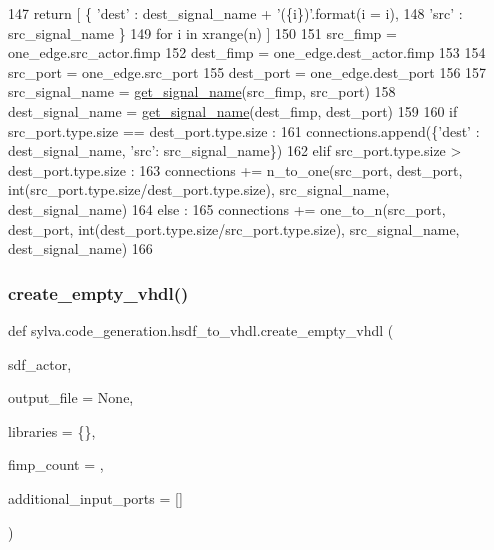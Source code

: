 \begin{DoxyCode}
147       \textcolor{keywordflow}{return} [ \{ \textcolor{stringliteral}{'dest'} : dest\_signal\_name + \textcolor{stringliteral}{'(\{i\})'}.format(i = i),
148                  \textcolor{stringliteral}{'src'}  : src\_signal\_name \}
149                \textcolor{keywordflow}{for} i \textcolor{keywordflow}{in} xrange(n) ]
150 
151   src\_fimp = one\_edge.src\_actor.fimp
152   dest\_fimp = one\_edge.dest\_actor.fimp
153 
154   src\_port = one\_edge.src\_port
155   dest\_port = one\_edge.dest\_port
156 
157   src\_signal\_name = \hyperlink{namespacesylva_1_1code__generation_1_1hsdf__to__vhdl_adfe6fda6b02f34c7fd4f2775ced8228f}{get\_signal\_name}(src\_fimp, src\_port)
158   dest\_signal\_name = \hyperlink{namespacesylva_1_1code__generation_1_1hsdf__to__vhdl_adfe6fda6b02f34c7fd4f2775ced8228f}{get\_signal\_name}(dest\_fimp, dest\_port)
159 
160   \textcolor{keywordflow}{if} src\_port.type.size == dest\_port.type.size :
161     connections.append(\{\textcolor{stringliteral}{'dest'} : dest\_signal\_name, \textcolor{stringliteral}{'src'}: src\_signal\_name\})
162   \textcolor{keywordflow}{elif} src\_port.type.size > dest\_port.type.size :
163     connections += n\_to\_one(src\_port, dest\_port, int(src\_port.type.size/dest\_port.type.size), 
      src\_signal\_name, dest\_signal\_name)
164   \textcolor{keywordflow}{else} :
165     connections += one\_to\_n(src\_port, dest\_port, int(dest\_port.type.size/src\_port.type.size), 
      src\_signal\_name, dest\_signal\_name)
166 
\end{DoxyCode}
\mbox{\label{namespacesylva_1_1code__generation_1_1hsdf__to__vhdl_a34788575516a0c7731b0e5abd4d42231}} 
\subsubsection{\texorpdfstring{create\+\_\+empty\+\_\+vhdl()}{create\_empty\_vhdl()}}
{\footnotesize\ttfamily def sylva.\+code\+\_\+generation.\+hsdf\+\_\+to\+\_\+vhdl.\+create\+\_\+empty\+\_\+vhdl (\begin{DoxyParamCaption}\item[{}]{sdf\+\_\+actor,  }\item[{}]{output\+\_\+file = {\ttfamily None},  }\item[{}]{libraries = {\ttfamily \{\}},  }\item[{}]{fimp\+\_\+count = {},  }\item[{}]{additional\+\_\+input\+\_\+ports = {\ttfamily \mbox{[}\mbox{]}} }\end{DoxyParamCaption})}



